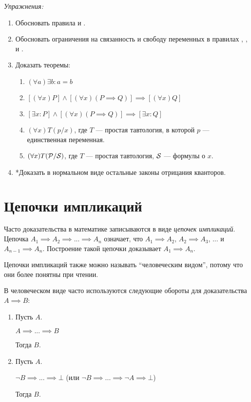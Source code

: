 {\it Упражнения:}
\begin{enumerate}
	\item{}Обосновать правила \Eii{} и \Eee{}.
	\item{}Обосновать ограничения на связанность и свободу переменных в правилах
	\Aii{}, \Aee{}, \Eii{} и \Eee{}.
	\pagebreak
	\item{}\label{ex:obv_thm}Доказать теоремы:
	\begin{fullwidth}
		\begin{multicols}{2}
			\begin{enumerate}
				\item{}$(\forall a)\exists b:a=b$
				\item{}$[(\forall x)P]\land[(\forall x)(P\implies Q)]
					\implies [(\forall x)Q]$\label{thm:obv_forall}
				\item{}$[\exists x:P]\land[(\forall x)(P\implies Q)]
					\implies [\exists x:Q]$
				\item{}$(\forall x)T(p/x)$, где $T$ --- простая тавтология,
				в которой $p$ --- единственная переменная.
				\item{}$(\forall x)T(\mathcal P/\mathcal S)$, где $T$ --- простая тавтология,
				$\mathcal S$ --- формулы о $x$.\label{thm:obv_taut}
			\end{enumerate}
		\end{multicols}
	\end{fullwidth}
	\item{}*Доказать в нормальном виде остальные законы отрицания кванторов.
\end{enumerate}

\section{Цепочки импликаций}

Часто доказательства в математике записываются в виде {\it цепочек импликаций}.
Цепочка $A_1\implies A_2\implies...\implies A_{n}$ означает, что $A_1\implies A_2$,
$A_2\implies A_3$, ... и $A_{n-1}\implies A_{n}$.
Построение такой цепочки доказывает $A_1\implies A_{n}$.

Цепочки импликаций также можно называть ``человеческим видом'', потому что они более
понятны при чтении.

В человеческом виде часто используются следующие обороты
для доказательства $A\implies B$:
\begin{enumerate}
	\item{}
	Пусть $A$.

	$A\implies ...\implies B$

	Тогда $B$.
	\item{}
	Пусть $A$.

	$\lnot B\implies ...\implies \bot$
	(или $\lnot B\implies ...\implies \lnot A\implies\bot$)

	Тогда $B$.
\end{enumerate}

